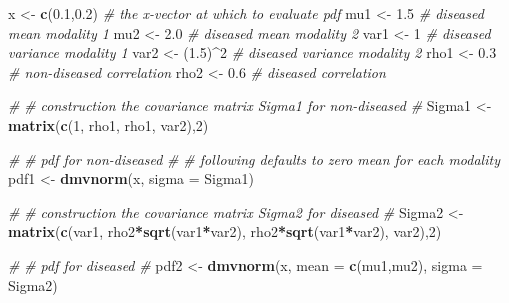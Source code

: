\documentclass[
]{book}
\newenvironment{Shaded}{\begin{snugshade}}{\end{snugshade}}
\newcommand{\CommentTok}[1]{\textcolor[rgb]{0.56,0.35,0.01}{\textit{#1}}}
\newcommand{\DataTypeTok}[1]{\textcolor[rgb]{0.13,0.29,0.53}{#1}}
\newcommand{\DecValTok}[1]{\textcolor[rgb]{0.00,0.00,0.81}{#1}}
\newcommand{\FloatTok}[1]{\textcolor[rgb]{0.00,0.00,0.81}{#1}}
\newcommand{\KeywordTok}[1]{\textcolor[rgb]{0.13,0.29,0.53}{\textbf{#1}}}
\newcommand{\NormalTok}[1]{#1}
\newcommand{\OperatorTok}[1]{\textcolor[rgb]{0.81,0.36,0.00}{\textbf{#1}}}
\newcommand{\StringTok}[1]{\textcolor[rgb]{0.31,0.60,0.02}{#1}}
\begin{document}
\begin{Shaded}
\begin{Highlighting}[]
\NormalTok{x <-}\StringTok{ }\KeywordTok{c}\NormalTok{(}\FloatTok{0.1}\NormalTok{,}\FloatTok{0.2}\NormalTok{) }\CommentTok{# the x-vector at which to evaluate pdf}
\NormalTok{mu1 <-}\StringTok{ }\FloatTok{1.5} \CommentTok{# diseased mean modality 1}
\NormalTok{mu2 <-}\StringTok{ }\FloatTok{2.0} \CommentTok{# diseased mean modality 2}
\NormalTok{var1 <-}\StringTok{ }\DecValTok{1}  \CommentTok{# diseased variance modality 1}
\NormalTok{var2 <-}\StringTok{ }\NormalTok{(}\FloatTok{1.5}\NormalTok{)}\OperatorTok{^}\DecValTok{2} \CommentTok{# diseased variance modality 2}
\NormalTok{rho1 <-}\StringTok{ }\FloatTok{0.3} \CommentTok{# non-diseased correlation}
\NormalTok{rho2 <-}\StringTok{ }\FloatTok{0.6} \CommentTok{# diseased correlation}

\CommentTok{#}
\CommentTok{# construction the covariance matrix Sigma1 for non-diseased}
\CommentTok{# }
\NormalTok{Sigma1 <-}\StringTok{ }\KeywordTok{matrix}\NormalTok{(}\KeywordTok{c}\NormalTok{(}\DecValTok{1}\NormalTok{, rho1, rho1, var2),}\DecValTok{2}\NormalTok{)}

\CommentTok{#}
\CommentTok{# pdf for non-diseased}
\CommentTok{# }
\CommentTok{# following defaults to zero mean for each modality}
\NormalTok{pdf1  <-}\StringTok{ }\KeywordTok{dmvnorm}\NormalTok{(x, }\DataTypeTok{sigma =}\NormalTok{ Sigma1) }

\CommentTok{#}
\CommentTok{# construction the covariance matrix Sigma2 for diseased}
\CommentTok{# }
\NormalTok{Sigma2 <-}\StringTok{ }\KeywordTok{matrix}\NormalTok{(}\KeywordTok{c}\NormalTok{(var1, rho2}\OperatorTok{*}\KeywordTok{sqrt}\NormalTok{(var1}\OperatorTok{*}\NormalTok{var2), rho2}\OperatorTok{*}\KeywordTok{sqrt}\NormalTok{(var1}\OperatorTok{*}\NormalTok{var2), var2),}\DecValTok{2}\NormalTok{)}

\CommentTok{#}
\CommentTok{# pdf for diseased}
\CommentTok{# }
\NormalTok{pdf2  <-}\StringTok{ }\KeywordTok{dmvnorm}\NormalTok{(x, }\DataTypeTok{mean =} \KeywordTok{c}\NormalTok{(mu1,mu2), }\DataTypeTok{sigma =}\NormalTok{ Sigma2)}


\end{Highlighting}
\end{Shaded}
\end{document}
